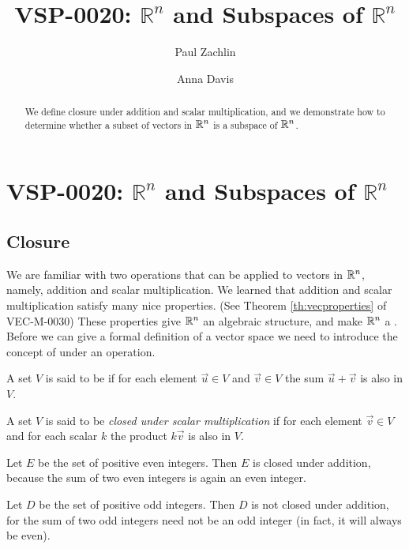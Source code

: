 \documentclass{ximera}
\author{Paul Zachlin \and Anna Davis} \title{VSP-0020:  $\mathbb{R}^n$ and Subspaces of $\mathbb{R}^n$} \license{CC-BY 4.0}
\begin{document}
\begin{abstract}
We define closure under addition and scalar multiplication, and we demonstrate how to determine whether a subset of vectors in $\mathbb{R}^n$ is a subspace of $\mathbb{R}^n$.
\end{abstract}

\maketitle
\section*{VSP-0020:  $\mathbb{R}^n$ and Subspaces of $\mathbb{R}^n$}
\subsection*{Closure}

We are familiar with two operations that can be applied to vectors in $\mathbb{R}^n$, namely, addition and scalar multiplication. We learned that addition and scalar multiplication satisfy many nice properties. (See Theorem \ref{th:vecproperties} of VEC-M-0030) These properties give $\mathbb{R}^n$ an algebraic structure, and make $\mathbb{R}^n$ a .  Before we can give a formal definition of a vector space we need to introduce the concept of  under an operation.

 \begin{definition} 
  A set $V$ is said to be  if for each element $\vec{u} \in V$ and $\vec{v} \in V$ the sum $\vec{u}+\vec{v}$ is also in $V$.
\end{definition}

  \begin{definition} 
  A set $V$ is said to be \emph{closed under scalar multiplication} if for each element $\vec{v} \in V$  and for each scalar $k$ the product $k\vec{v}$ is also in $V$.
\end{definition}


\begin{example}
Let $E$ be the set of positive even integers.  Then $E$ is closed under addition, because the sum of two even integers is again an even integer.
\end{example}

\begin{example}
Let $D$ be the set of positive odd integers.  Then $D$ is not closed under addition, for the sum of two odd integers need not be an odd integer (in fact, it will always be even).
\end{example}
\end{document}
